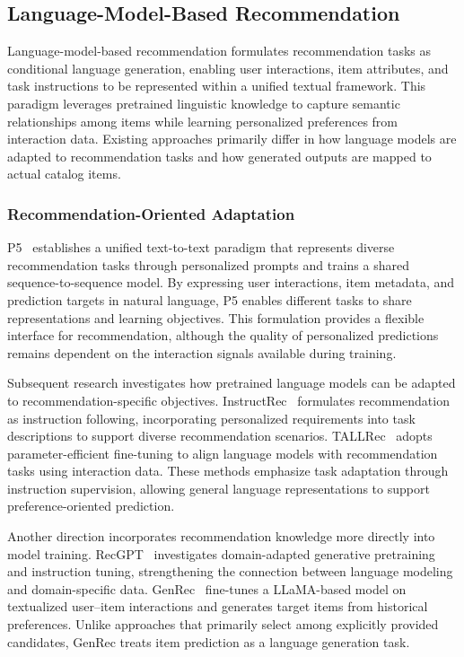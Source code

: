 \documentclass[sigconf,nonacm]{acmart}
\begin{document}
\subsection{Language-Model-Based Recommendation}
\label{sec:lm}

Language-model-based recommendation formulates recommendation
tasks as conditional language generation, enabling user
interactions, item attributes, and task instructions to be
represented within a unified textual framework. This paradigm
leverages pretrained linguistic knowledge to capture semantic
relationships among items while learning personalized preferences
from interaction data. Existing approaches primarily differ in
how language models are adapted to recommendation tasks and
how generated outputs are mapped to actual catalog items.

\subsubsection{Recommendation-Oriented Adaptation}

P5~\cite{p5} establishes a unified text-to-text paradigm
that represents diverse recommendation tasks through personalized
prompts and trains a shared sequence-to-sequence model.
By expressing user interactions, item metadata, and prediction
targets in natural language, P5 enables different tasks to share
representations and learning objectives. This formulation
provides a flexible interface for recommendation, although
the quality of personalized predictions remains dependent on
the interaction signals available during training.

Subsequent research investigates how pretrained language models
can be adapted to recommendation-specific objectives.
InstructRec~\cite{instructrec} formulates recommendation as
instruction following, incorporating personalized requirements
into task descriptions to support diverse recommendation
scenarios. TALLRec~\cite{tallrec} adopts parameter-efficient
fine-tuning to align language models with recommendation
tasks using interaction data. These methods emphasize task
adaptation through instruction supervision, allowing general
language representations to support preference-oriented
prediction.

Another direction incorporates recommendation knowledge
more directly into model training. RecGPT~\cite{recgpt}
investigates domain-adapted generative pretraining
and instruction tuning, strengthening the connection between
language modeling and domain-specific data.
GenRec~\cite{genrec} fine-tunes a LLaMA-based model on
textualized user--item interactions and generates target items
from historical preferences. Unlike approaches that primarily
select among explicitly provided candidates, GenRec treats
item prediction as a language generation task.
\end{document}
